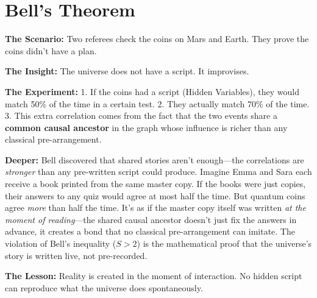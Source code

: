 \documentclass[11pt, a4paper, openany]{book}
\begin{document}
\section{Bell's Theorem}
\begin{thoughtexp}
\textbf{The Scenario:} Two referees check the coins on Mars and Earth. They prove the coins didn't have a plan.

\textbf{The Insight:} The universe does not have a script. It improvises.

\textbf{The Experiment:}
1. If the coins had a script (Hidden Variables), they would match 50\% of the time in a certain test.
2. They actually match 70\% of the time.
3. This extra correlation comes from the fact that the two events share a \textbf{common causal ancestor} in the graph whose influence is richer than any classical pre-arrangement.

\textbf{Deeper:} Bell discovered that shared stories aren't enough---the correlations are \emph{stronger} than any pre-written script could produce. Imagine Emma and Sara each receive a book printed from the same master copy. If the books were just copies, their answers to any quiz would agree at most half the time. But quantum coins agree \emph{more} than half the time. It's as if the master copy itself was written \emph{at the moment of reading}---the shared causal ancestor doesn't just fix the answers in advance, it creates a bond that no classical pre-arrangement can imitate. The violation of Bell's inequality ($S > 2$) is the mathematical proof that the universe's story is written live, not pre-recorded.

\textbf{The Lesson:} Reality is created in the moment of interaction. No hidden script can reproduce what the universe does spontaneously.
\end{thoughtexp}
\end{document}
